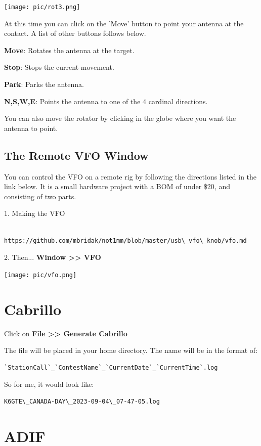 \documentclass{article}
\begin{document}
\vspace{0.5cm}
\texttt{[image: pic/rot3.png]}
\vspace{0.5cm}

At this time you can click on the 'Move' button to point your antenna at the contact. A list of other buttons follows below.

\textbf{Move}: Rotates the antenna at the target.

\textbf{Stop}: Stops the current movement.

\textbf{Park}: Parks the antenna.

\textbf{N,S,W,E}: Points the antenna to one of the 4 cardinal directions.

You can also move the rotator by clicking in the globe where you want the antenna to point.



\subsection{The Remote VFO Window}

You can control the VFO on a remote rig by following the directions listed in the link below. It is a small hardware project with a BOM of under \$20, and consisting of two parts.

1. Making the VFO
\begin{verbatim}
    https://github.com/mbridak/not1mm/blob/master/usb\_vfo\_knob/vfo.md
\end{verbatim}

2. Then... \textbf{Window >> VFO}

\vspace{0.5cm}
\texttt{[image: pic/vfo.png]}
\newpage
\section{Cabrillo}

Click on \textbf{File >> Generate Cabrillo}

The file will be placed in your home directory. The name will be in the format of:
\begin{verbatim}
`StationCall`_`ContestName`_`CurrentDate`_`CurrentTime`.log
\end{verbatim}
So for me, it would look like:
\begin{verbatim}
K6GTE\_CANADA-DAY\_2023-09-04\_07-47-05.log
\end{verbatim}

\section{ADIF}
\end{document}
